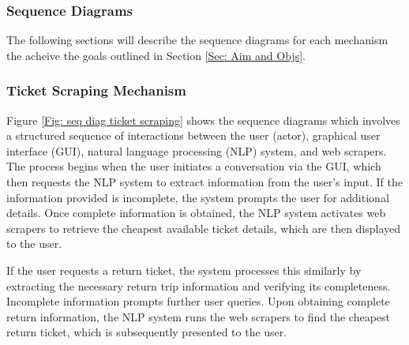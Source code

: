 


\subsubsection{Sequence Diagrams}\label{Sec: Sequence Diagrams}
The following sections will describe the sequence diagrams for each mechanism the acheive the goals outlined in Section \ref{Sec: Aim and Objs}.
\subsubsection*{Ticket Scraping Mechanism}
Figure \ref{Fig: seq diag ticket scraping} shows the sequence diagrams which involves a structured sequence of interactions between the user (actor), graphical user interface (GUI), natural language processing (NLP) system, and web scrapers. The process begins when the user initiates a conversation via the GUI, which then requests the NLP system to extract information from the user's input. If the information provided is incomplete, the system prompts the user for additional details. Once complete information is obtained, the NLP system activates web scrapers to retrieve the cheapest available ticket details, which are then displayed to the user.\vspace{0.5cm}

\noindent
If the user requests a return ticket, the system processes this similarly by extracting the necessary return trip information and verifying its completeness. Incomplete information prompts further user queries. Upon obtaining complete return information, the NLP system runs the web scrapers to find the cheapest return ticket, which is subsequently presented to the user.\vspace{0.5cm}

